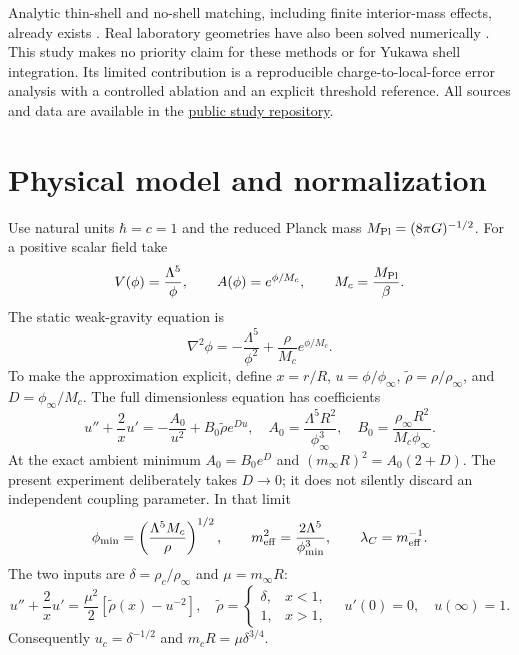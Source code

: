 \documentclass[11pt,a4paper]{article}
\begin{document}
Analytic thin-shell and no-shell matching, including finite interior-mass
effects, already exists \cite{TamakiTsujikawa}. Real laboratory geometries have
also been solved numerically \cite{Elder2016,Schlogel2016}. This study makes no
priority claim for these methods or for Yukawa shell integration. Its limited
contribution is a reproducible charge-to-local-force error analysis with a
controlled ablation and an explicit threshold reference. All sources and data
are available in the
\href{https://github.com/Lasqui-Ponto/Mechanics_Term_Project/tree/agent/improve-chameleon-project/Thin_Shell_Study}{public study repository}.

\section{Physical model and normalization}
Use natural units $\hbar=c=1$ and the reduced Planck mass
$M_{\mathrm{Pl}}=(8\pi G)^{-1/2}$. For a positive scalar field take
\begin{equation}
 V(\phi)=\frac{\Lambda^5}{\phi},\qquad A(\phi)=e^{\phi/M_c},
 \qquad M_c=\frac{M_{\mathrm{Pl}}}{\beta}.
\end{equation}
The static weak-gravity equation is
\begin{equation}
 \nabla^2\phi=-\frac{\Lambda^5}{\phi^2}+\frac{\rho}{M_c}e^{\phi/M_c}.
\end{equation}
To make the approximation explicit, define $x=r/R$, $u=\phi/\phi_\infty$,
$\widetilde\rho=\rho/\rho_\infty$, and $D=\phi_\infty/M_c$. The full
dimensionless equation has coefficients
\begin{equation}
 u''+\frac2x u'=-\frac{A_0}{u^2}+B_0\widetilde\rho e^{Du},
 \quad A_0=\frac{\Lambda^5R^2}{\phi_\infty^3},\quad
 B_0=\frac{\rho_\infty R^2}{M_c\phi_\infty}.
\end{equation}
At the exact ambient minimum $A_0=B_0e^D$ and
$(m_\infty R)^2=A_0(2+D)$. The present experiment deliberately takes
$D\to0$; it does not silently discard an independent coupling parameter.
In that limit
\begin{equation}
 \phi_{\min}=\left(\frac{\Lambda^5M_c}{\rho}\right)^{1/2},\qquad
 m_{\rm eff}^2=\frac{2\Lambda^5}{\phi_{\min}^3},\qquad
 \lambda_C=m_{\rm eff}^{-1}.
\end{equation}
The two inputs are $\delta=\rho_c/\rho_\infty$ and $\mu=m_\infty R$:
\begin{equation}
 u''+\frac2x u'=\frac{\mu^2}{2}[\widetilde\rho(x)-u^{-2}],
 \quad \widetilde\rho=\begin{cases}\delta,&x<1,\\1,&x>1,\end{cases}
 \quad u'(0)=0,\quad u(\infty)=1.
 \label{eq:bvp}
\end{equation}
Consequently $u_c=\delta^{-1/2}$ and $m_cR=\mu\delta^{3/4}$.
\end{document}
